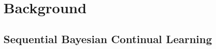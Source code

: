 \documentclass{article}
\begin{document}


\section{Background}

\subsection{Sequential Bayesian Continual Learning}
\end{document}
